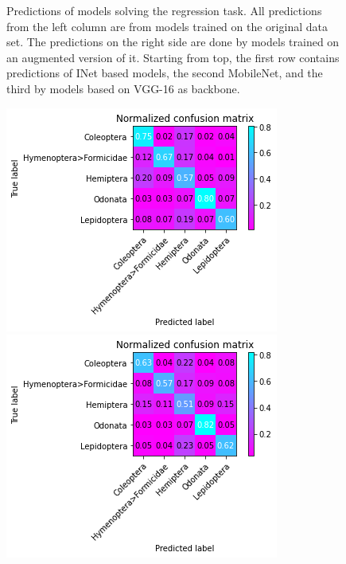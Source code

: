 \begin{figure}
\begin{multicols}{2}
\begin{minipage}{.45\textwidth}
        \end{minipage}
    \end{multicols}
    \caption{Predictions of models solving the regression task. All predictions from the left column are from models trained on the original data set. The predictions on the right side are done by models trained on an augmented version of it.
    Starting from top, the first row contains predictions of INet based models, the second MobileNet, and the third by models based on VGG-16 as backbone.}
    \label{fig:regression-samples}
\end{figure}

\begin{figure}
    \centering
    \begin{multicols}{2}
        \begin{minipage}{.45\textwidth}
            \includegraphics[width=\textwidth]{images/classification-inet.png}
        \end{minipage}
        \columnbreak
        \begin{minipage}{.45\textwidth}
            \includegraphics[width=\textwidth]{images/augmented-classification-inet.png}

\end{minipage}
\end{multicols}
\end{figure}

